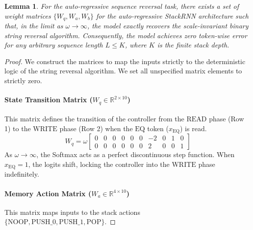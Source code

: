 \documentclass[11pt]{article}
\newtheorem{lemma}{Lemma}
\begin{document}
\begin{lemma}
For the auto-regressive sequence reversal task, there exists a set of weight matrices $\{W_q, W_a, W_b\}$ for the auto-regressive StackRNN architecture such that, in the limit as $\omega \to \infty$, the model exactly recovers the scale-invariant binary string reversal algorithm. Consequently, the model achieves zero token-wise error for any arbitrary sequence length $L \le K$, where $K$ is the finite stack depth.
\end{lemma}

\begin{proof}
We construct the matrices to map the inputs strictly to the deterministic logic of the string reversal algorithm. We set all
unspecified matrix elements to strictly zero.

\paragraph{ State Transition Matrix ($W_q \in \mathbb{R}^{2 \times 10}$)}
This matrix defines the transition of the controller from  the $\text{READ}$ phase (Row 1) to the $\text{WRITE}$ phase (Row 2) when the $\text{EQ}$ token ($x_{\text{EQ}}$) is read.
\begin{equation}
W_q = \omega \begin{bmatrix}
0 & 0 & 0 & 0 & 0 & 0 & -2 & 0 & 1 & 0 \\
0 & 0 & 0 & 0 & 0 & 0 & 2 & 0 & 0 & 1
\end{bmatrix}
\end{equation}
As $\omega \to \infty$, the Softmax acts as a perfect discontinuous step function. When $x_{\text{EQ}} = 1$, the logits shift, locking the controller into the $\text{WRITE}$ phase indefinitely.

\paragraph{Memory Action Matrix ($W_a \in \mathbb{R}^{4 \times 10}$)}
This matrix maps inputs to the stack actions \\ $\{\text{NOOP}, \text{PUSH\_0}, \text{PUSH\_1}, \text{POP}\}$.


\end{proof}
\end{document}
